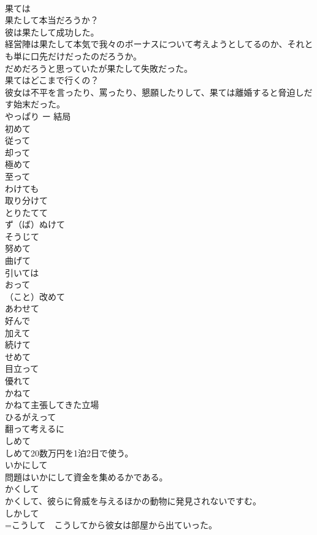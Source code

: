 \documentclass[8pt]{extreport}
\begin{document}
\begin{CJK}{UTF8}{min}
\\	果ては	
\\	果たして本当だろうか？ 
\\	彼は果たして成功した。 
\\	経営陣は果たして本気で我々のボーナスについて考えようとしてるのか、それとも単に口先だけだったのだろうか。 
\\	だめだろうと思っていたが果たして失敗だった。 
\\	果てはどこまで行くの？　
\\	彼女は不平を言ったり、罵ったり、懇願したりして、果ては離婚すると脅迫しだす始末だった。
\\	やっぱり ー 結局 
\\	初めて
\\	従って
\\	却って
\\	極めて
\\	至って
\\	わけても 
\\	取り分けて
\\	とりたてて
\\	ず（ば）ぬけて 
\\	そうじて 
\\	努めて 
\\	曲げて 
\\	引いては 
\\	おって 
\\	（こと）改めて 
\\	あわせて 
\\	好んで 
\\	加えて 
\\	続けて 
\\	せめて 
\\	目立って 
\\	優れて 
\\	かねて 
\\	かねて主張してきた立場 
\\	ひるがえって　
\\	翻って考えるに 
\\	しめて 
\\	しめて20数万円を1泊2日で使う。
\\	いかにして 
\\	問題はいかにして資金を集めるかである。 
\\	かくして 
\\	かくして、彼らに脅威を与えるほかの動物に発見されないですむ。
\\	しかして 
\\	=こうして　こうしてから彼女は部屋から出ていった。

\end{CJK}
\end{document}
